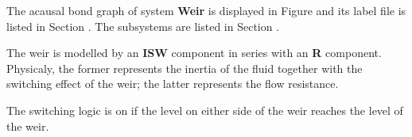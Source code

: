 

   The acausal bond graph of system \textbf{Weir} is
   displayed in Figure  and its label
   file is listed in Section .
   The subsystems are listed in Section .


The weir is modelled by an \textbf{ISW} component in series with an
\textbf{R} component. Physicaly, the former represents the inertia of
the fluid together with the switching effect of the weir; the latter
represents the flow resistance.

The switching logic is on if the level on either side of the weir
reaches the level of the weir.
